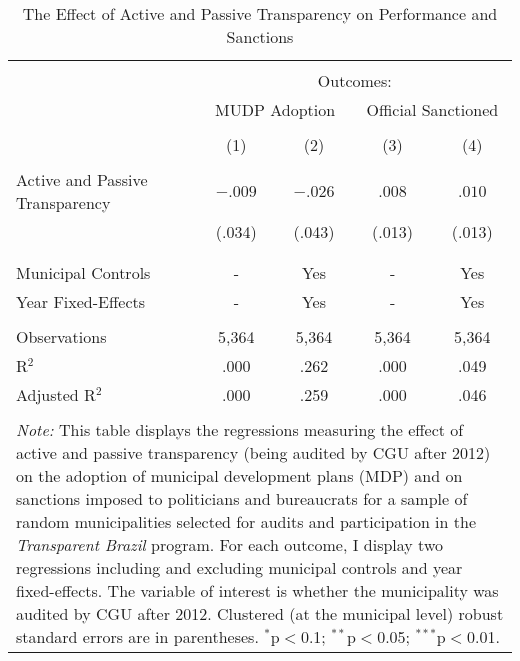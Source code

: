 
\begin{table}[!htbp] \centering
  \caption{The Effect of Active and Passive Transparency on Performance and Sanctions}
  \label{tab:performance3}
\scriptsize
\begin{tabular}{@{\extracolsep{.5cm}}lcccc}
\\[-1.8ex]\hline
\hline \\[-1.8ex]
& \multicolumn{4}{c}{Outcomes:} \T \B \\
\cline{2-5}
 & \multicolumn{2}{c}{MUDP Adoption} & \multicolumn{2}{c}{Official Sanctioned} \T \B \\
\\[-1.8ex] & \multicolumn{1}{c}{(1)} & \multicolumn{1}{c}{(2)} & \multicolumn{1}{c}{(3)} & \multicolumn{1}{c}{(4)}\\
\hline \\[-1.8ex]
 Active and Passive Transparency & $-.009$ & $-.026$ & \hspace{1pt} $.008$ & \hspace{1pt} $.010$ \\
                                 & (.034) & (.043) & (.013) & (.013) \\
                                 & & & & \\
\hline \\[-1.8ex]
Municipal Controls & \multicolumn{1}{c}{-} & \multicolumn{1}{c}{Yes} & \multicolumn{1}{c}{-} & \multicolumn{1}{c}{Yes} \\
Year Fixed-Effects & \multicolumn{1}{c}{-} & \multicolumn{1}{c}{Yes} & \multicolumn{1}{c}{-} & \multicolumn{1}{c}{Yes} \\
\hline \\[-1.8ex]
Observations & \multicolumn{1}{c}{5,364} & \multicolumn{1}{c}{5,364} & \multicolumn{1}{c}{5,364} & \multicolumn{1}{c}{5,364} \\
R$^{2}$ & \multicolumn{1}{c}{.000} & \multicolumn{1}{c}{.262} & \multicolumn{1}{c}{.000} & \multicolumn{1}{c}{.049} \\
Adjusted R$^{2}$ & \multicolumn{1}{c}{.000} & \multicolumn{1}{c}{.259} & \multicolumn{1}{c}{.000} & \multicolumn{1}{c}{.046} \\
\hline
\hline \\[-1.8ex]
\multicolumn{5}{p{.65\textwidth}}{\emph{Note:} This table displays the regressions measuring the effect of active and passive transparency (being audited by CGU after 2012) on the adoption of municipal development plans (MDP) and on sanctions imposed to politicians and bureaucrats for a sample of random municipalities selected for audits and participation in the \emph{Transparent Brazil} program. For each outcome, I display two regressions including and excluding municipal controls and year fixed-effects. The variable of interest is whether the municipality was audited by CGU after 2012. Clustered (at the municipal level) robust standard errors are in parentheses. $^{*}$p$<$0.1; $^{**}$p$<$0.05; $^{***}$p$<$0.01.}
\end{tabular}
\end{table}
